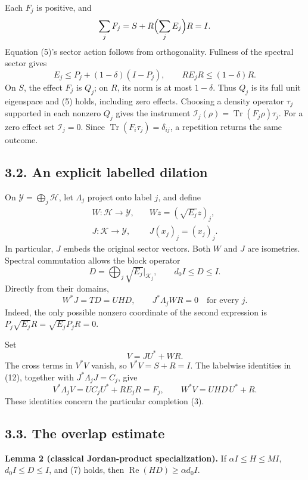 \documentclass[
  11pt,
  a4paper,
]{article}
\begin{document}
Each \(F_j\) is positive, and \[\sum_jF_j=S+R\Bigl(\sum_jE_j\Bigr)R=I.\]
Equation (5)'s sector action follows from orthogonality. Fullness of the
spectral sector gives \[E_j\le P_j+(1-\delta)(I-P_j),\qquad
RE_jR\le(1-\delta)R.
\tag{10}\] On \(S\), the effect \(F_j\) is \(Q_j\); on \(R\), its norm
is at most \(1-\delta\). Thus \(Q_j\) is its full unit eigenspace and
(5) holds, including zero effects. Choosing a density operator
\(\tau_j\) supported in each nonzero \(Q_j\) gives the instrument
\(\mathcal I_j(\rho)=\operatorname{Tr}(F_j\rho)\tau_j\). For a zero
effect set \(\mathcal I_j=0\). Since
\(\operatorname{Tr}(F_i\tau_j)=\delta_{ij}\), a repetition returns the
same outcome.

\subsection{3.2. An explicit labelled
dilation}\label{an-explicit-labelled-dilation}

On \(\mathcal Y=\bigoplus_j\mathcal H\), let \(\Lambda_j\) project onto
label \(j\), and define \[\begin{aligned}
W:\mathcal H\to\mathcal Y,&\quad Wz=(\sqrt{E_j}z)_j,\\
J:\mathcal K\to\mathcal Y,&\quad J(x_j)_j=(x_j)_j.
\end{aligned}
\tag{11}\] In particular, \(J\) embeds the original sector vectors. Both
\(W\) and \(J\) are isometries. Spectral commutation allows the block
operator \[D=\bigoplus_j\sqrt{E_j}\big|_{\mathcal K_j},
\qquad d_0I\le D\le I.\] Directly from their domains,
\[W^*J=TD=UHD,\qquad
J^*\Lambda_jWR=0\quad\text{for every }j.
\tag{12}\] Indeed, the only possible nonzero coordinate of the second
expression is \(P_j\sqrt{E_j}R=\sqrt{E_j}P_jR=0\).

Set \[V=JU^*+WR.
\tag{13}\] The cross terms in \(V^*V\) vanish, so \(V^*V=S+R=I\). The
labelwise identities in (12), together with \(J^*\Lambda_jJ=C_j\), give
\[V^*\Lambda_jV=UC_jU^*+RE_jR=F_j,\qquad
W^*V=UHD\,U^*+R.
\tag{14}\] These identities concern the particular completion (3).

\subsection{3.3. The overlap estimate}\label{the-overlap-estimate}

\textbf{Lemma 2 (classical Jordan-product specialization).} If
\(\alpha I\le H\le MI\), \(d_0I\le D\le I\), and (7) holds, then
\(\operatorname{Re}(HD)\ge\alpha d_0I\).
\end{document}
